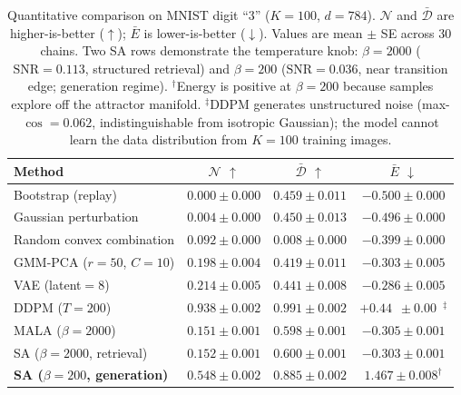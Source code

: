 \begin{table}[t]
\centering
\caption{Quantitative comparison on MNIST digit ``3'' ($K=100$, $d=784$). $\mathcal{N}$ and $\bar{\mathcal{D}}$ are higher-is-better ($\uparrow$); $\bar{E}$ is lower-is-better ($\downarrow$). Values are mean $\pm$ SE across 30 chains. Two SA rows demonstrate the temperature knob: $\beta{=}2000$ ($\mathrm{SNR}{=}0.113$, structured retrieval) and $\beta{=}200$ ($\mathrm{SNR}{=}0.036$, near transition edge; generation regime). $^\dagger$Energy is positive at $\beta{=}200$ because samples explore off the attractor manifold. $^\ddagger$DDPM generates unstructured noise (max-$\cos=0.062$, indistinguishable from isotropic Gaussian); the model cannot learn the data distribution from $K{=}100$ training images.}
\label{tab:mnist-baselines}
\small
\begin{tabular}{@{}lccc@{}}
\toprule
Method & $\mathcal{N}$ $\uparrow$ & $\bar{\mathcal{D}}$ $\uparrow$ & $\bar{E}$ $\downarrow$ \\
\midrule
Bootstrap (replay)          & $0.000 \pm 0.000$ & $0.459 \pm 0.011$ & $-0.500 \pm 0.000$ \\
Gaussian perturbation       & $0.004 \pm 0.000$ & $0.450 \pm 0.013$ & $-0.496 \pm 0.000$ \\
Random convex combination   & $0.092 \pm 0.000$ & $0.008 \pm 0.000$ & $-0.399 \pm 0.000$ \\
GMM-PCA ($r{=}50$, $C{=}10$) & $0.198 \pm 0.004$ & $0.419 \pm 0.011$ & $-0.303 \pm 0.005$ \\
VAE (latent${=}8$)          & $0.214 \pm 0.005$ & $0.441 \pm 0.008$ & $-0.286 \pm 0.005$ \\
DDPM ($T{=}200$)            & $0.938 \pm 0.002$ & $0.991 \pm 0.002$ & $+0.44\phantom{0} \pm 0.00\phantom{0}$$^\ddagger$ \\
MALA ($\beta{=}2000$)       & $0.151 \pm 0.001$ & $0.598 \pm 0.001$ & $-0.305 \pm 0.001$ \\
SA ($\beta{=}2000$, retrieval) & $0.152 \pm 0.001$ & $0.600 \pm 0.001$ & $-0.303 \pm 0.001$ \\
\textbf{SA ($\beta{=}200$, generation)} & $\mathbf{0.548 \pm 0.002}$ & $\mathbf{0.885 \pm 0.002}$ & $1.467 \pm 0.008^\dagger$ \\
\bottomrule
\end{tabular}
\end{table}

